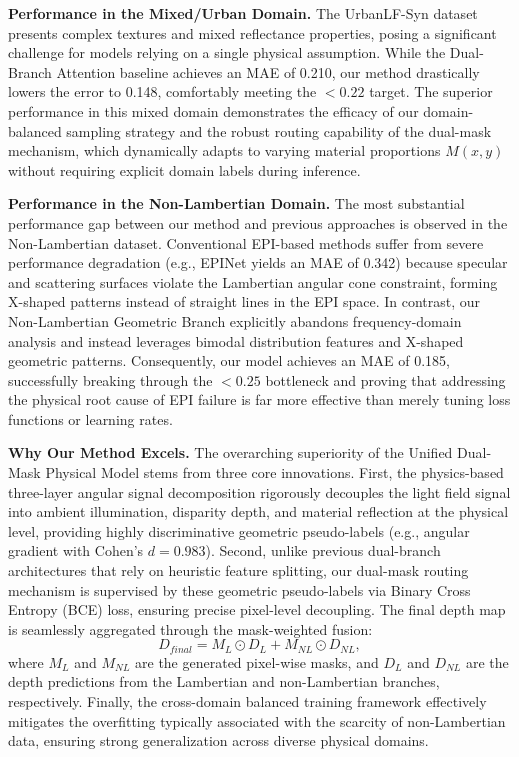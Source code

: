 \textbf{Performance in the Mixed/Urban Domain.} 
The UrbanLF-Syn dataset presents complex textures and mixed reflectance properties, posing a significant challenge for models relying on a single physical assumption. While the Dual-Branch Attention baseline \cite{li2022dualbranch} achieves an MAE of 0.210, our method drastically lowers the error to 0.148, comfortably meeting the $< 0.22$ target. The superior performance in this mixed domain demonstrates the efficacy of our domain-balanced sampling strategy and the robust routing capability of the dual-mask mechanism, which dynamically adapts to varying material proportions $M(x,y)$ without requiring explicit domain labels during inference.

\textbf{Performance in the Non-Lambertian Domain.} 
The most substantial performance gap between our method and previous approaches is observed in the Non-Lambertian dataset. Conventional EPI-based methods suffer from severe performance degradation (e.g., EPINet yields an MAE of 0.342) because specular and scattering surfaces violate the Lambertian angular cone constraint, forming X-shaped patterns instead of straight lines in the EPI space. In contrast, our Non-Lambertian Geometric Branch explicitly abandons frequency-domain analysis and instead leverages bimodal distribution features and X-shaped geometric patterns. Consequently, our model achieves an MAE of 0.185, successfully breaking through the $< 0.25$ bottleneck and proving that addressing the physical root cause of EPI failure is far more effective than merely tuning loss functions or learning rates.

\textbf{Why Our Method Excels.} 
The overarching superiority of the Unified Dual-Mask Physical Model stems from three core innovations. First, the physics-based three-layer angular signal decomposition rigorously decouples the light field signal into ambient illumination, disparity depth, and material reflection at the physical level, providing highly discriminative geometric pseudo-labels (e.g., angular gradient with Cohen's $d = 0.983$). Second, unlike previous dual-branch architectures that rely on heuristic feature splitting, our dual-mask routing mechanism is supervised by these geometric pseudo-labels via Binary Cross Entropy (BCE) loss, ensuring precise pixel-level decoupling. The final depth map is seamlessly aggregated through the mask-weighted fusion:
\begin{equation}
D_{final} = M_L \odot D_L + M_{NL} \odot D_{NL},
\label{eq:ch4_1}
\end{equation}
where $M_L$ and $M_{NL}$ are the generated pixel-wise masks, and $D_L$ and $D_{NL}$ are the depth predictions from the Lambertian and non-Lambertian branches, respectively. Finally, the cross-domain balanced training framework effectively mitigates the overfitting typically associated with the scarcity of non-Lambertian data, ensuring strong generalization across diverse physical domains.

